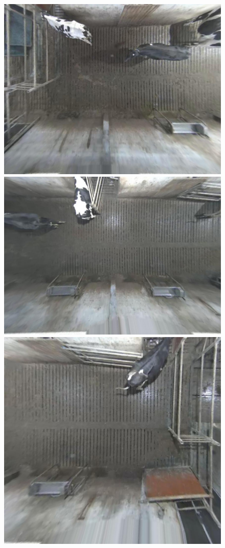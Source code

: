 \documentclass{IET}
\begin{document}
\begin{figure}[b]
\begin{center}
  \includegraphics[height=0.15\textheight]{left_single.jpg}
  \includegraphics[height=0.15\textheight]{mid_single.jpg}
  \includegraphics[height=0.15\textheight]{right_single.jpg}

\end{center}
\end{figure}
\end{document}
